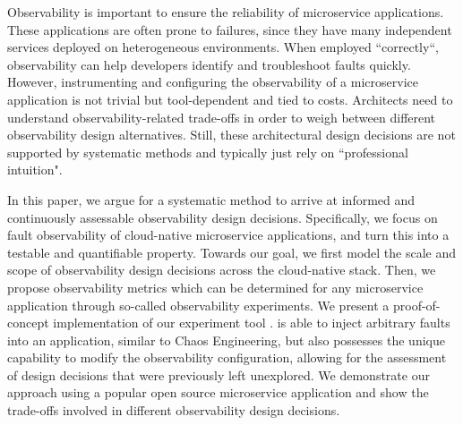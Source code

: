 Observability is important to ensure the reliability of microservice applications. These applications are often prone to failures, since they have many independent services deployed on heterogeneous environments. When employed “correctly“, observability can help developers identify and troubleshoot faults quickly. However, %
instrumenting and configuring the observability of a microservice application is not trivial but tool-dependent and tied to costs. 
Architects need to understand observability-related trade-offs in order to weigh between different observability design alternatives. 
Still, these architectural design decisions are not supported by systematic methods and typically just rely on ``professional intuition".  

In this paper, we argue for a systematic method to arrive at informed and continuously assessable observability design decisions. Specifically, we focus on fault observability of cloud-native microservice applications, and turn this into a testable and quantifiable property. %
Towards our goal, we first model the scale and scope of observability design decisions across the cloud-native stack. Then, we propose observability metrics which can be determined for any microservice application through so-called observability experiments. We present a proof-of-concept implementation of our experiment tool \name{}. \name{} is able to inject arbitrary faults into an application, similar to Chaos Engineering, but also possesses the unique capability to modify the observability configuration, allowing for the assessment of design decisions that were previously left unexplored. %
We demonstrate our approach using a popular open source microservice application and show the trade-offs involved in different observability design decisions.

